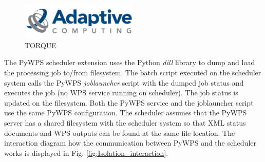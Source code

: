 \documentclass[12pt,a4paper]{article}
\begin{document}
\begin{figure}[h!]
\centering
\begin{floatrow}
\end{floatrow}
\end{figure}

\begin{figure}[h!]
\centering
\includegraphics[width=0.5\textwidth]{img/Isolation_torque.png}
\caption{TORQUE}
\label{fig:Isolation_torque}
\end{figure}

The PyWPS scheduler extension uses the Python \textit{dill} library to dump and load the processing job to/from filesystem. The batch script executed on the scheduler system calls the PyWPS \textit{joblauncher} script with the dumped job status and executes the job (no WPS service running on scheduler). The job status is updated on the filesystem. Both the PyWPS service and the joblauncher script use the same PyWPS configuration. The scheduler assumes that the PyWPS server has a shared filesystem with the scheduler system so that XML status documents and WPS outputs can be found at the same file location. The interaction diagram how the communication between PyWPS and the scheduler works is displayed in Fig. \ref{fig:Isolation_interaction}.
\end{document}
